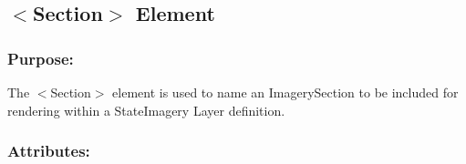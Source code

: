 \begin{DoxyCode}{0}
\end{DoxyCode}
\hypertarget{fal_element_ref_fal_elem_ref_sec_29}{}\subsection{$<$\+Section$>$ Element}\label{fal_element_ref_fal_elem_ref_sec_29}
\hypertarget{fal_element_ref_fal_elem_ref_sec_29_1}{}\subsubsection{Purpose\+:}\label{fal_element_ref_fal_elem_ref_sec_29_1}
The {\ttfamily $<$Section$>$} element is used to name an Imagery\+Section to be included for rendering within a State\+Imagery Layer definition.\hypertarget{fal_element_ref_fal_elem_ref_sec_29_2}{}\subsubsection{Attributes\+:}\label{fal_element_ref_fal_elem_ref_sec_29_2}
